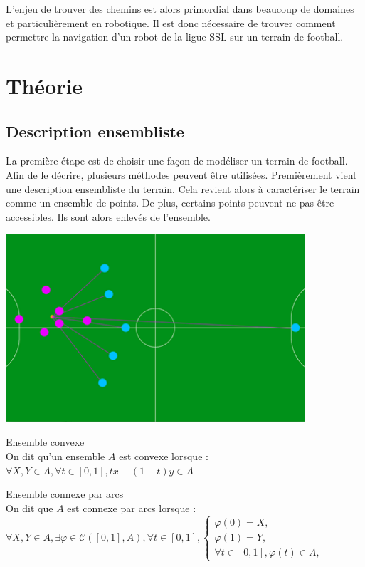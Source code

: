 L’enjeu de trouver des chemins est alors primordial dans beaucoup de domaines et particulièrement en robotique. 
Il est donc nécessaire de trouver comment permettre la navigation d’un robot de la ligue SSL sur un terrain de football.

\section{Théorie}

\subsection{Description ensembliste}

La première étape est de choisir une façon de modéliser un terrain de football. Afin de le décrire, plusieurs méthodes peuvent 
être utilisées. 
Premièrement vient une description ensembliste du terrain. Cela revient alors à caractériser le terrain comme un ensemble de 
points. De plus, certains points peuvent ne pas être accessibles. Ils sont alors enlevés de l’ensemble.

\begin{center}
    \includegraphics[height=7cm]{4.png}
\end{center}

\begin{definition} Ensemble convexe \\
    On dit qu'un ensemble $A$ est convexe lorsque : \\
$\forall X,Y \in A, \forall t \in [0,1], tx+(1-t)y \in A$
\end{definition}

\begin{definition} Ensemble connexe par arcs \\
    On dit que $A$ est connexe par arcs lorsque : \\
    $\forall X,Y \in A,\exists \varphi \in \mathcal{C}([0,1],A),\forall t \in [0,1], \begin{cases} \varphi(0)=X, & \mbox{ }  \\ \varphi(1)=Y, & \mbox{ }\mbox{ }\\\forall t \in [0,1], \varphi(t) \in A, & \mbox{ } \mbox{ } \end{cases}$
\end{definition}

